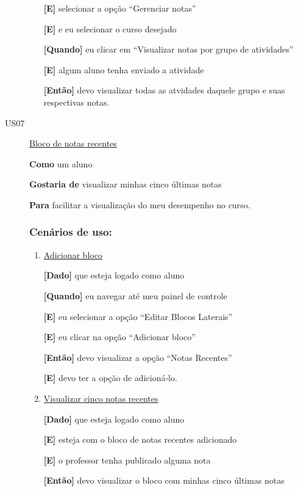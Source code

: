 \begin{description}
\begin{enumerate}
\textbf{[E]} selecionar a opção ``Gerenciar notas''

\textbf{[E]} e eu selecionar o curso desejado

\textbf{[Quando]} eu clicar em ``Visualizar notas por grupo de atividades''

\textbf{[E]} algum aluno tenha enviado a atividade

\textbf{[Então]} devo visualizar todas as atvidades daquele grupo e suas respectivas notas.

\end{enumerate}


\item [US07\label{us07}] \underline{Bloco de notas recentes}

\textbf{Como} um aluno

\textbf{Gostaria de} visualizar minhas cinco últimas notas

\textbf{Para} facilitar a visualização do meu desempenho no curso.

\subsubsection*{Cenários de uso:}

\begin{enumerate}

\item \underline{Adicionar bloco}

\textbf{[Dado]} que esteja logado como aluno

\textbf{[Quando]} eu navegar até meu painel de controle

\textbf{[E]} eu selecionar a opção ``Editar Blocos Laterais''

\textbf{[E]} eu clicar na opção ``Adicionar bloco''

\textbf{[Então]} devo visualizar a opção ``Notas Recentes''

\textbf{[E]} devo ter a opção de adicioná-lo.

\item \underline{Visualizar cinco notas recentes}

\textbf{[Dado]} que esteja logado como aluno

\textbf{[E]} esteja com o bloco de notas recentes adicionado

\textbf{[E]} o professor tenha publicado alguma nota

\textbf{[Então]} devo visualizar o bloco com minhas cinco últimas notas


\end{enumerate}
\end{description}
